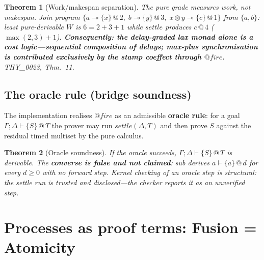 \documentclass[11pt]{article}
\makeatletter
\newcommand{\lax}[2]{\{#1\}\mathbin{@}#2}       %
\newcommand{\loli}{\multimap}                    %
\newcommand{\tensor}{\otimes}                    %
\newcommand{\stmp}[2]{#1\mathbin{@}#2}           %
\newcommand{\settle}{\mathit{settle}}
\newtheorem{theorem}{Theorem}[section]
\theoremstyle{definition}
\theoremstyle{remark}
\makeatother
\begin{document}
\begin{theorem}[Work/makespan separation]
\label{thm:separation}
The pure grade measures work, not makespan.  Join program $\{a \loli \lax{x}{2},\;
b \loli \lax{y}{3},\; x \tensor y \loli \lax{c}{1}\}$ from $\{a, b\}$: least
pure-derivable $W$ is $6 = 2{+}3{+}1$ while $\settle$ produces $\stmp{c}{4}$
($\max(2,3){+}1$).  \textbf{Consequently: the delay-graded lax monad alone is a
cost logic---sequential composition of delays; max-plus synchronisation is
contributed exclusively by the stamp coeffect through $\mathit{@fire}$.}
THY\_0023, Thm.~11.
\end{theorem}

\subsection{The oracle rule (bridge soundness)}
\label{subsec:oracle}

The implementation realises $\mathit{@fire}$ as an admissible \textbf{oracle rule}:
for a goal $\Gamma; \Delta \vdash \lax{S}{T}$ the prover may run $\settle(\Delta,
T)$ and then prove $S$ against the residual timed multiset by the pure calculus.

\begin{theorem}[Oracle soundness]
\label{thm:oracle}
If the oracle succeeds, $\Gamma; \Delta \vdash \lax{S}{T}$ is derivable.  The
\textbf{converse is false and not claimed}: \textit{sub} derives $a \vdash
\lax{a}{d}$ for every $d \geq 0$ with no forward step.  Kernel checking of an
oracle step is structural: the settle run is trusted and \emph{disclosed}---the
checker reports it as an unverified step.
\end{theorem}

\section{Processes as proof terms: Fusion = Atomicity}
\label{sec:processes}
\end{document}
